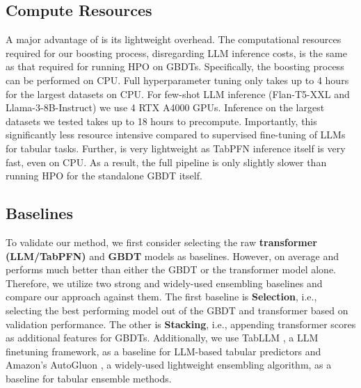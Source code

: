 \subsection{Compute Resources}
\label{compute}
A major advantage of \methodname is its lightweight overhead. The computational resources required for our boosting process, disregarding LLM inference costs, is the same as that required for running HPO on GBDTs. Specifically, the boosting process can be performed on CPU. Full hyperparameter tuning only takes up to 4 hours for the largest datasets on CPU.  For few-shot LLM inference (Flan-T5-XXL and Llama-3-8B-Instruct) we use 4 RTX A4000 GPUs. Inference on the largest datasets we tested takes up to 18 hours to precompute. Importantly, this significantly less resource intensive compared to supervised fine-tuning of LLMs for tabular tasks.  Further, \methodnamepfn is very lightweight as TabPFN inference itself is very fast, even on CPU. As a result, the full \methodnamepfn pipeline is only slightly slower than running HPO for the standalone GBDT itself. 

\subsection{Baselines}
\label{baselines}
To validate our method, we first consider selecting the raw {\bf transformer (LLM/TabPFN)} and {\bf GBDT} models as baselines. However, on average \methodname and \methodnamepfn performs much better than either the GBDT or the transformer model alone. Therefore, we utilize two strong and widely-used ensembling baselines and compare our approach against them. The first baseline is {\bf Selection}, i.e., selecting the best performing model out of the GBDT and transformer based on validation performance. The other is {\bf Stacking}, i.e., appending transformer scores as additional features for GBDTs. Additionally, we use TabLLM \citep{hegselmann2023tabllm}, a LLM finetuning framework, as a baseline for LLM-based tabular predictors and Amazon's AutoGluon \citep{agtabular}, a widely-used lightweight ensembling algorithm, as a baseline for tabular ensemble methods.

